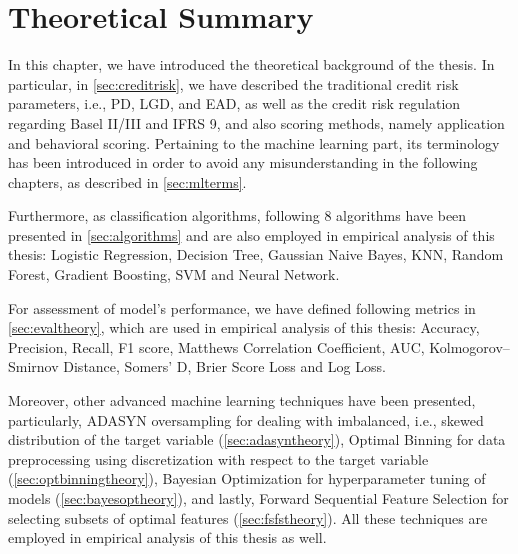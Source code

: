 \newpage
\section{Theoretical Summary}

In this chapter, we have introduced the theoretical background of the thesis.
In particular, in \autoref{sec:creditrisk}, we have described the traditional credit risk parameters, i.e., PD, LGD, and EAD, as well as the credit risk regulation regarding Basel II/III and IFRS 9, and also scoring methods, namely application and behavioral scoring.
Pertaining to the machine learning part, its terminology has been introduced in order to avoid any misunderstanding in the following chapters, as described in  \autoref{sec:mlterms}.

Furthermore, as classification algorithms, following 8 algorithms have been presented in \autoref{sec:algorithms} and are also employed in empirical analysis of this thesis: Logistic Regression, Decision Tree, Gaussian Naive Bayes, KNN, Random Forest, Gradient Boosting, SVM and Neural Network.

For assessment of model's performance, we have defined following metrics in \autoref{sec:evaltheory}, which are used in empirical analysis of this thesis: Accuracy, Precision, Recall, F1 score, Matthews Correlation Coefficient, AUC, Kolmogorov--Smirnov Distance, Somers' D, Brier Score Loss and Log Loss.

Moreover, other advanced machine learning techniques have been presented, particularly, ADASYN oversampling for dealing with imbalanced, i.e., skewed distribution of the target variable (\autoref{sec:adasyntheory}), Optimal Binning for data preprocessing using discretization with respect to the target variable (\autoref{sec:optbinningtheory}),
Bayesian Optimization for hyperparameter tuning of models (\autoref{sec:bayesoptheory}), and lastly, Forward Sequential Feature Selection for selecting subsets of optimal features (\autoref{sec:fsfstheory}).
All these techniques are employed in empirical analysis of this thesis as well.